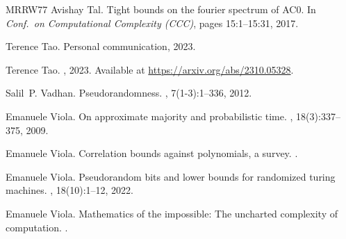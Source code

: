 \documentclass[10pt,a4paper]{article}
\theoremstyle{definition}
\begin{document}
\begin{thebibliography}{MRRW77}
Avishay Tal.
\newblock Tight bounds on the fourier spectrum of {AC0}.
\newblock In {\em Conf.~on Computational Complexity (CCC)}, pages 15:1--15:31, 2017.

Terence Tao.
\newblock Personal communication, 2023.

Terence Tao.
, 2023.
\newblock Available at \url{https://arxiv.org/abs/2310.05328}.

Salil~P. Vadhan.
\newblock Pseudorandomness.
, 7(1-3):1--336, 2012.

Emanuele Viola.
\newblock On approximate majority and probabilistic time.
, 18(3):337--375, 2009.

Emanuele Viola.
\newblock Correlation bounds against polynomials, a survey.
.

Emanuele Viola.
\newblock Pseudorandom bits and lower bounds for randomized turing machines.
, 18(10):1--12, 2022.

Emanuele Viola.
\newblock Mathematics of the impossible: The uncharted complexity of computation.
.

\end{thebibliography}
\end{document}
